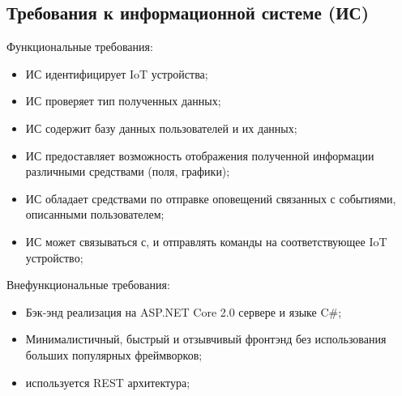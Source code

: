     \subsection{Требования к информационной системе (ИС)}
    Функциональные требования:
    \begin{itemize}
        \item ИС идентифицирует IoT устройства; 
        \item ИС проверяет тип полученных данных;
        \item ИС содержит базу данных пользователей и их данных;
        \item ИС предоставляет возможность отображения полученной информации различными средствами (поля, графики);
        \item ИС обладает средствами по отправке оповещений связанных с событиями, описанными пользователем;
        \item ИС может связываться с, и отправлять команды на соответствующее IoT устройство;
    \end{itemize}
    Внефункциональные требования:
    \begin{itemize}
        \item Бэк-энд реализация на ASP.NET Core 2.0 сервере и языке C\#;
        \item Минималистичный, быстрый и отзывчивый фронтэнд без использования больших популярных
         фреймворков;
        \item используется REST архитектура;
    \end{itemize}